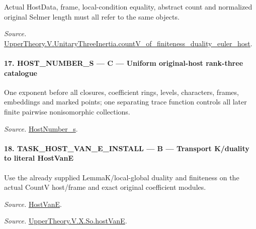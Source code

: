 \documentclass[11pt,a4paper]{article}
\numberwithin{equation}{section}
\theoremstyle{remark}\newtheorem{remark}[theorem]{Remark}
\begin{document}
Actual HostData, frame, local-condition equality, abstract count and normalized original Selmer length must all refer to the same objects.

\emph{Source.} \href{https://github.com/CocoSgt/riemann-hypothesis-lean/blob/7cbf7a0c32fca1badf05931879a37c3f8a2b03b4/src/Development/AutomorphicArithmetic/AutomorphicVarieties/ModularityArgument/ThresholdArguments/DenseThresholdCases/CountVOf.lean#L33-L60}{UpperTheory.V.UnitaryThreeInertia.countV\_\allowbreak of\_\allowbreak finiteness\_\allowbreak duality\_\allowbreak euler\_\allowbreak host}.



\paragraph{17. HOST\_\allowbreak NUMBER\_\allowbreak S — C — Uniform original-host rank-three catalogue}

One exponent before all closures, coefficient rings, levels, characters, frames, embeddings and marked points; one separating trace function controls all later finite pairwise nonisomorphic collections.

\emph{Source.} \href{https://github.com/CocoSgt/riemann-hypothesis-lean/blob/7cbf7a0c32fca1badf05931879a37c3f8a2b03b4/src/Development/AutomorphicArithmetic/AutomorphicVarieties/ModularityArgument/ThresholdArguments/DenseThresholdCases/HostNumberS.lean#L18-L28}{HostNumber\_\allowbreak s}.



\paragraph{18. TASK\_\allowbreak HOST\_\allowbreak VAN\_\allowbreak E\_\allowbreak INSTALL — B — Transport K/duality to literal HostVanE}

Use the already supplied LemmaK/local-global duality and finiteness on the actual CountV host/frame and exact original coefficient modules.

\emph{Source.} \href{https://github.com/CocoSgt/riemann-hypothesis-lean/blob/7cbf7a0c32fca1badf05931879a37c3f8a2b03b4/src/Development/AutomorphicArithmetic/AutomorphicVarieties/UnitaryThreeDeformations/HostNumber.lean#L9-L12}{HostVanE}.

\emph{Source.} \href{https://github.com/CocoSgt/riemann-hypothesis-lean/blob/7cbf7a0c32fca1badf05931879a37c3f8a2b03b4/src/Development/AutomorphicArithmetic/AutomorphicVarieties/LevelCohomology/SoHostVanE.lean#L11-L18}{UpperTheory.V.X.So.hostVanE}.
\end{document}
